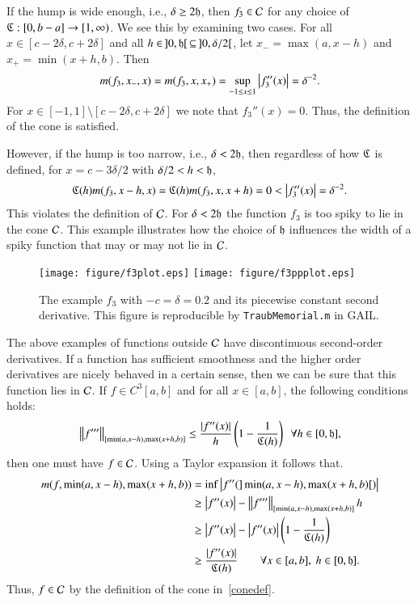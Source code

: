 \documentclass[review]{elsarticle}
\theoremstyle{definition}
\begin{document}
If the hump is wide enough, i.e., $\delta \ge 2 \fh$, then $f_3 \in \cc$ for any
choice of $\fC : [0,b-a] \to [1,\infty)$. We see this by examining two cases.
For all $x \in [c - 2 \delta, c + 2 \delta]$ and all $h \in \, ]0,\fh[ \,
\subseteq \, ]0,\delta/2[$, let $x_- = \max(a, x -h)$ and $x_+ = \min(x +h,b)$.
Then
\[
m(f_3,x_-,x) = m(f_3,x,x_+) = \sup_{-1 \le x \le 1} \abs{f_3''(x)}  = \delta^{-2}.
\]
For $x \in [-1,1] \setminus [c - 2 \delta , c + 2 \delta]$ we note that
$f_3''(x) = 0$. Thus, the definition of the cone is satisfied.

However, if the hump is too narrow, i.e., $\delta < 2 \fh$, then regardless of how
$\fC$ is defined, for $x = c-3\delta/2$ with $\delta/2 < h < \fh$,
\[
\fC(h)m(f_3,x - h,x)=\fC(h)m(f_3,x,x+h)=0 < \abs{f''_3(x)} = \delta^{-2}.
\]
This violates the definition of $\cc$. For $\delta < 2 \fh$ the function $f_3$
is too spiky to lie in the cone $\cc$. This example illustrates how the choice
of $\fh$ influences the width of a spiky function that may or may not lie in
$\cc$.

\begin{figure}[t]
\centering
\texttt{[image: figure/f3plot.eps]} \quad
\texttt{[image: figure/f3ppplot.eps]}
\caption{The example $f_3$ with $-c=\delta = 0.2$ and its piecewise constant
second derivative. This figure is reproducible by {\tt TraubMemorial.m} in
GAIL.}
\label{f3fig}
\end{figure}

The above examples of functions outside $\cc$ have discontinuous second-order
derivatives. If a function has sufficient smoothness and the higher order
derivatives are nicely behaved in a certain sense, then we can be sure that this
function lies in $\cc$. If $f \in C^3[a,b]$ and for all $x \in [a,b]$, the
following conditions holds:
\begin{equation} \label{conesuffconda}
\norm[{[\min(a,x-h),\max(x+h,b)]}]{f'''} \le \frac{\abs{f''(x)}}{h} \left( 1 - \frac{1}{\fC(h)} \right) \ \ \forall h \in [0,\fh],
\end{equation}
then one must have $f \in \cc$.  Using a Taylor expansion it follows that.
\begin{align*}
m(f,\min(a,x-h),\max(x+h,b)) & = \inf \abs{f''(]\min(a,x-h),\max(x+h,b)[)} \\
& \ge \abs{f''(x)}  - \norm[{[\min(a,x-h),\max(x+h,b)]}]{f'''}h \\
& \ge \abs{f''(x)}  - \abs{f''(x)}\left( 1 - \frac{1}{\fC(h)} \right) \\
& \ge \frac{\abs{f''(x)}}{\fC(h)} \qquad \forall x \in [a,b],\ h \in [0,\fh].
\end{align*}
Thus, $f \in \cc$ by the definition of the cone in~\eqref{conedef}.
\end{document}
